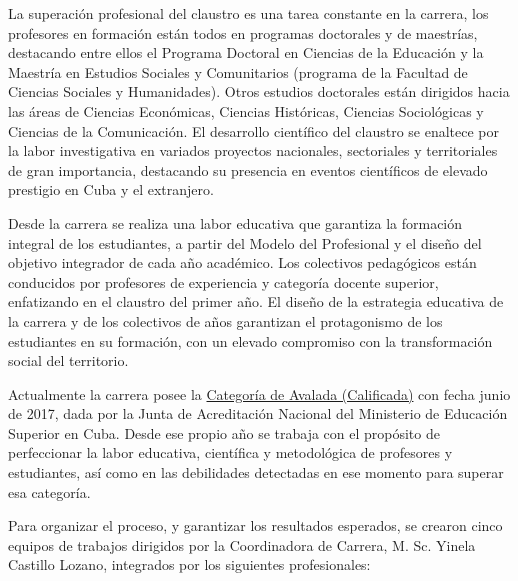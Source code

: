 La superación profesional del claustro es una tarea constante en la carrera, los profesores en formación están todos en programas doctorales y de maestrías, destacando entre ellos el Programa Doctoral en Ciencias de la Educación y la Maestría en Estudios Sociales y Comunitarios (programa de la Facultad de Ciencias Sociales y Humanidades). Otros estudios doctorales están dirigidos hacia las áreas de Ciencias Económicas, Ciencias Históricas, Ciencias Sociológicas y Ciencias de la Comunicación. El desarrollo científico del claustro se enaltece por la labor investigativa en variados proyectos nacionales, sectoriales y territoriales de gran importancia, destacando su presencia en eventos científicos de elevado prestigio en Cuba y el extranjero. 

Desde la carrera se realiza una labor educativa que garantiza la formación integral de los estudiantes, a partir del Modelo del Profesional y el diseño del objetivo integrador de cada año académico. Los colectivos pedagógicos están conducidos por profesores de experiencia y categoría docente superior, enfatizando en el claustro del primer año. El diseño de la estrategia educativa de la carrera y de los colectivos de años garantizan el protagonismo de los estudiantes en su formación, con un elevado compromiso con la transformación social del territorio.

Actualmente la carrera posee la \underline{Categoría de Avalada (Calificada)} con fecha junio de 2017, dada por la Junta de Acreditación Nacional del Ministerio de Educación Superior en Cuba. Desde ese propio año se trabaja con el propósito de perfeccionar la labor educativa, científica y metodológica de profesores y estudiantes, así como en las debilidades detectadas en ese momento para superar esa categoría. 

Para organizar el proceso, y garantizar los resultados esperados, se crearon cinco equipos de trabajos dirigidos por la Coordinadora de Carrera, M. Sc. Yinela Castillo Lozano, integrados por los siguientes profesionales: 

\vspace*{2cm} 


